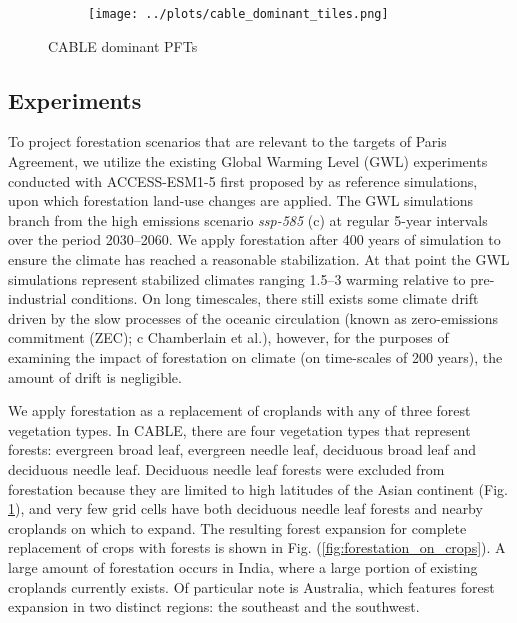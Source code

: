 \documentclass[]{article}
\begin{document}
\begin{figure}[H]
    \begin{subfigure}[b]{\linewidth}
        \centering
        \texttt{[image: ../plots/cable\_dominant\_tiles.png]}
    \end{subfigure}
    \caption{CABLE dominant PFTs}
    \label{fig:dominant_pfts}
\end{figure}

\subsection{Experiments}

To project forestation scenarios that are relevant to the targets of Paris Agreement, we utilize the existing Global Warming Level (GWL) experiments conducted with ACCESS-ESM1-5 first proposed by \cite{king_studying_2021} as reference simulations, upon which forestation land-use changes are applied. The GWL simulations branch from the high emissions scenario \textit{ssp-585} (c) at regular 5-year intervals over the period 2030–2060. We apply forestation after 400 years of simulation to ensure the climate has reached a reasonable stabilization. At that point the GWL simulations represent stabilized climates ranging 1.5–3 \textcelsius warming relative to pre-industrial conditions. On long timescales, there still exists some climate drift driven by the slow processes of the oceanic circulation (known as zero-emissions commitment (ZEC); c Chamberlain et al.), however, for the purposes of examining the impact of forestation on climate (on time-scales of 200 years), the amount of drift is negligible.

We apply forestation as a replacement of croplands with any of three forest vegetation types.
In CABLE, there are four vegetation types that represent forests: evergreen broad leaf, evergreen needle leaf, deciduous broad leaf and deciduous needle leaf.
Deciduous needle leaf forests were excluded from forestation because they are limited to high latitudes of the Asian continent (Fig. \ref{fig:dominant_pfts}), and very few grid cells have both deciduous needle leaf forests and nearby croplands on which to expand.
The resulting forest expansion for complete replacement of crops with forests is shown in Fig. (\ref{fig:forestation_on_crops}).
A large amount of forestation occurs in India, where a large portion of existing croplands currently exists.
Of particular note is Australia, which features forest expansion in two distinct regions: the southeast and the southwest.
\end{document}
